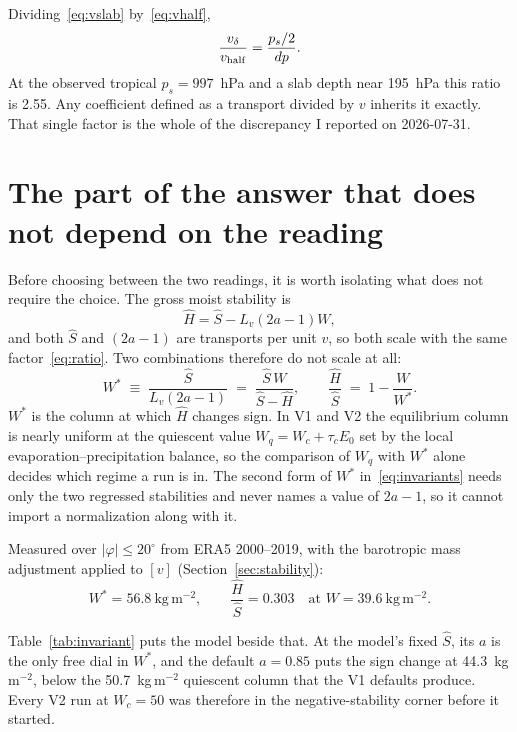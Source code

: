 \documentclass[11pt]{article}
\newcommand{\Shat}{\hat S}
\newcommand{\Hhat}{\hat H}
\newcommand{\Wq}{W_q}
\newcommand{\Wstar}{W^*}
\newcommand{\vhalf}{v_{\rm half}}
\newcommand{\vslab}{v_{\delta}}
\begin{document}
Dividing~\eqref{eq:vslab} by~\eqref{eq:vhalf},
%
\begin{equation}
\frac{\vslab}{\vhalf} = \frac{p_s/2}{dp}.
\label{eq:ratio}
\end{equation}
%
At the observed tropical $p_s = 997$~hPa and a slab depth near 195~hPa this
ratio is 2.55. Any coefficient defined as a transport divided by $v$ inherits
it exactly. That single factor is the whole of the discrepancy I reported on
2026-07-31.

\section{The part of the answer that does not depend on the reading}
\label{sec:invariant}

Before choosing between the two readings, it is worth isolating what does not
require the choice. The gross moist stability is
%
\begin{equation}
\Hhat = \Shat - L_v(2a-1)W,
\label{eq:hhat}
\end{equation}
%
and both $\Shat$ and $(2a-1)$ are transports per unit $v$, so both scale with
the same factor~\eqref{eq:ratio}. Two combinations therefore do not scale at
all:
%
\begin{equation}
\Wstar \;\equiv\; \frac{\Shat}{L_v(2a-1)}
      \;=\; \frac{\Shat\,W}{\Shat - \Hhat},
\qquad
\frac{\Hhat}{\Shat} \;=\; 1 - \frac{W}{\Wstar}.
\label{eq:invariants}
\end{equation}
%
$\Wstar$ is the column at which $\Hhat$ changes sign. In V1 and V2 the
equilibrium column is nearly uniform at the quiescent value
$\Wq = W_c + \tau_c E_0$ set by the local evaporation--precipitation balance,
so the comparison of $\Wq$ with $\Wstar$ alone decides which regime a run is
in. The second form of $\Wstar$ in~\eqref{eq:invariants} needs only the two
regressed stabilities and never names a value of $2a-1$, so it cannot import a
normalization along with it.

Measured over $|\varphi|\le 20^\circ$ from ERA5 2000--2019, with the barotropic
mass adjustment applied to $[v]$ (Section~\ref{sec:stability}):
%
\begin{equation}
\Wstar = 56.8~\mathrm{kg\,m^{-2}},
\qquad
\frac{\Hhat}{\Shat} = 0.303 \quad\text{at } W = 39.6~\mathrm{kg\,m^{-2}}.
\end{equation}

Table~\ref{tab:invariant} puts the model beside that. At the model's fixed
$\Shat$, its $a$ is the only free dial in $\Wstar$, and the default $a=0.85$
puts the sign change at 44.3~kg\,m$^{-2}$, below the 50.7~kg\,m$^{-2}$
quiescent column that the V1 defaults produce. Every V2 run at $W_c=50$ was
therefore in the negative-stability corner before it started.
\end{document}
